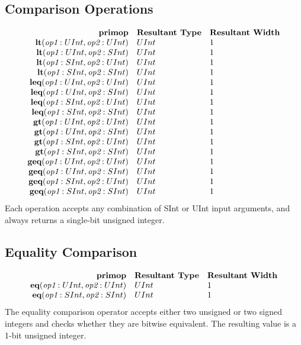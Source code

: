 \documentclass[12pt]{article}
\begin{document}
\subsection{Comparison Operations}
\[
\begin{array}{rll}
\text{\bf primop} & \text{\bf Resultant Type} & \text{\bf Resultant Width} \\
\text{\bf lt}      (\text{\em op1}:UInt, \text{\em op2}:UInt) & UInt & 1    \\
\text{\bf lt}      (\text{\em op1}:UInt, \text{\em op2}:SInt) & UInt & 1    \\
\text{\bf lt}      (\text{\em op1}:SInt, \text{\em op2}:UInt) & UInt & 1    \\
\text{\bf lt}      (\text{\em op1}:SInt, \text{\em op2}:SInt) & UInt & 1    \\
\text{\bf leq}     (\text{\em op1}:UInt, \text{\em op2}:UInt) & UInt & 1    \\
\text{\bf leq}     (\text{\em op1}:UInt, \text{\em op2}:SInt) & UInt & 1    \\
\text{\bf leq}     (\text{\em op1}:SInt, \text{\em op2}:UInt) & UInt & 1    \\
\text{\bf leq}     (\text{\em op1}:SInt, \text{\em op2}:SInt) & UInt & 1    \\
\text{\bf gt}      (\text{\em op1}:UInt, \text{\em op2}:UInt) & UInt & 1    \\
\text{\bf gt}      (\text{\em op1}:UInt, \text{\em op2}:SInt) & UInt & 1    \\
\text{\bf gt}      (\text{\em op1}:SInt, \text{\em op2}:UInt) & UInt & 1    \\
\text{\bf gt}      (\text{\em op1}:SInt, \text{\em op2}:SInt) & UInt & 1    \\
\text{\bf geq}     (\text{\em op1}:UInt, \text{\em op2}:UInt) & UInt & 1    \\
\text{\bf geq}     (\text{\em op1}:UInt, \text{\em op2}:SInt) & UInt & 1    \\
\text{\bf geq}     (\text{\em op1}:SInt, \text{\em op2}:UInt) & UInt & 1    \\
\text{\bf geq}     (\text{\em op1}:SInt, \text{\em op2}:SInt) & UInt & 1    \\
\end{array}
\]
Each operation accepts any combination of SInt or UInt input arguments, and always returns a single-bit unsigned integer.

\subsection{Equality Comparison}
\[
\begin{array}{rll}
\text{\bf primop} & \text{\bf Resultant Type} & \text{\bf Resultant Width} \\
\text{\bf eq}(\text{\em op1}:UInt, \text{\em op2}:UInt)     & UInt & 1 \\
\text{\bf eq}(\text{\em op1}:SInt, \text{\em op2}:SInt)     & UInt & 1 \\
\end{array}
\]
The equality comparison operator accepts either two unsigned or two signed integers and checks whether they are bitwise equivalent.
The resulting value is a 1-bit unsigned integer. 
\end{document}
